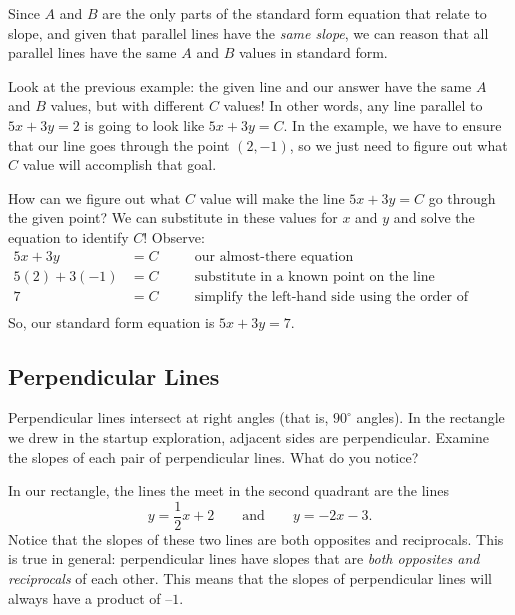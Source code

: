 Since $A$ and $B$ are the only parts of the standard form equation that relate to slope, and given that parallel lines have the \textit{same slope}, we can reason that all parallel lines have the same $A$ and $B$ values in standard form.

Look at the previous example: the given line and our answer have the same $A$ and $B$ values, but with different $C$ values! In other words, any line parallel to $5x+3y=2$ is going to look like $5x+3y=C$. In the example, we have to ensure that our line goes through the point $(2,-1)$, so we just need to figure out what $C$ value will accomplish that goal.

How can we figure out what $C$ value will make the line $5x + 3y = C$ go through the given point? We can substitute in these values for $x$ and $y$ and solve the equation to identify $C$! Observe:
\[\begin{aligned}
5x + 3y &= C
&& \quad\text{our almost-there equation}\\
5(2) + 3(-1) &= C
&& \quad\text{substitute in a known point on the line}\\
7 &= C
&& \quad\text{simplify the left-hand side using the order of operations}\\
\end{aligned}\]
So, our standard form equation is $5x + 3y = 7$.

\subsection{Perpendicular Lines}

Perpendicular lines intersect at right angles (that is, $90^\circ$ angles). In the rectangle we drew in the startup exploration, adjacent sides are perpendicular. Examine the slopes of each pair of perpendicular lines. What do you notice?

In our rectangle, the lines the meet in the second quadrant are the lines \[y=\frac{1}{2}x+2 \qquad\text{and}\qquad y=-2x-3.\] Notice that the slopes of these two lines are both opposites and reciprocals. This is true in general: perpendicular lines have slopes that are \textit{both opposites and reciprocals} of each other. This means that the slopes of perpendicular lines will always have a product of $–1$.

